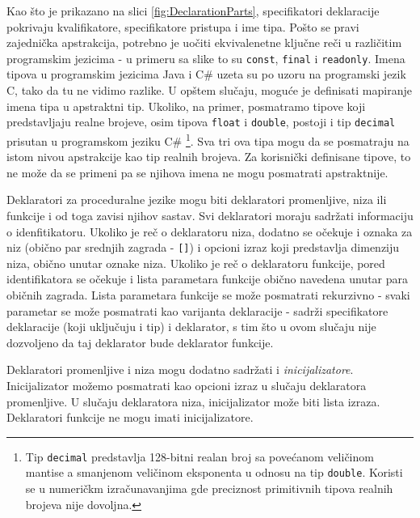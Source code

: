 Kao što je prikazano na slici \ref{fig:DeclarationParts}, specifikatori deklaracije pokrivaju kvalifikatore, specifikatore pristupa i ime tipa. Pošto se pravi zajednička apstrakcija, potrebno je uočiti ekvivalenetne ključne reči u različitim programskim jezicima - u primeru sa slike to su \texttt{const}, \texttt{final} i \texttt{readonly}. Imena tipova u programskim jezicima Java i C\# uzeta su po uzoru na programski jezik C, tako da tu ne vidimo razlike. U opštem slučaju, moguće je definisati mapiranje imena tipa u apstraktni tip. Ukoliko, na primer, posmatramo tipove koji predstavljaju realne brojeve, osim tipova \texttt{float} i \texttt{double}, postoji i tip \texttt{decimal} prisutan u programskom jeziku C\# \footnote{Tip \texttt{decimal} predstavlja 128-bitni realan broj sa povećanom veličinom mantise a smanjenom veličinom eksponenta u odnosu na tip \texttt{double}. Koristi se u numeričkm izračunavanjima gde preciznost primitivnih tipova realnih brojeva nije dovoljna.}. Sva tri ova tipa mogu da se posmatraju na istom nivou apstrakcije kao tip realnih brojeva. Za korisnički definisane tipove, to ne može da se primeni pa se njihova imena ne mogu posmatrati apstraktnije.

Deklaratori za proceduralne jezike mogu biti deklaratori promenljive, niza ili funkcije i od toga zavisi njihov sastav. Svi deklaratori moraju sadržati informaciju o idenfitikatoru. Ukoliko je reč o deklaratoru niza, dodatno se očekuje i oznaka za niz (obično par srednjih zagrada - \texttt{[]}) i opcioni izraz koji predstavlja dimenziju niza, obično unutar oznake niza. Ukoliko je reč o deklaratoru funkcije, pored identifikatora se očekuje i lista parametara funkcije obično navedena unutar para običnih zagrada. Lista parametara funkcije se može posmatrati rekurzivno - svaki parametar se može posmatrati kao varijanta deklaracije - sadrži specifikatore deklaracije (koji uključuju i tip) i deklarator, s tim što u ovom slučaju nije dozvoljeno da taj deklarator bude deklarator funkcije. 

Deklaratori promenljive i niza mogu dodatno sadržati i \emph{inicijalizatore}. Inicijalizator možemo posmatrati kao opcioni izraz u slučaju deklaratora promenljive. U slučaju deklaratora niza, inicijalizator može biti lista izraza. Deklaratori funkcije ne mogu imati inicijalizatore.

